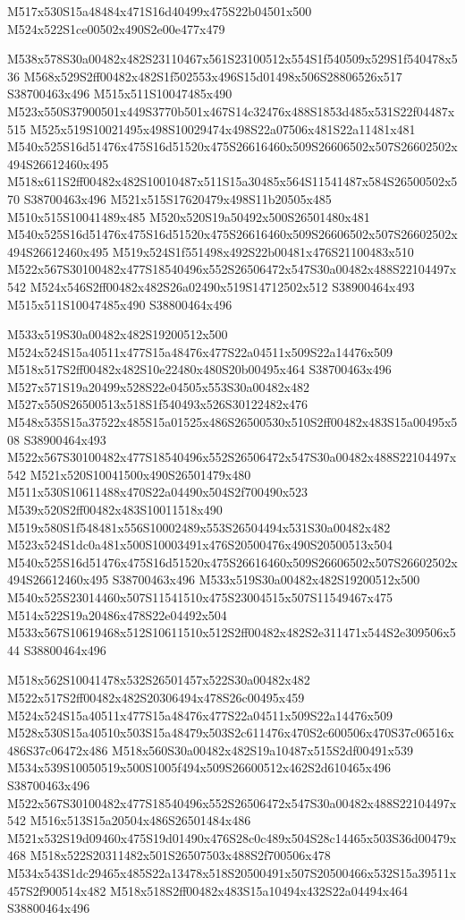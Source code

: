 \documentclass{article}
\begin{document}
\begin{multicols}{2}
\begin{center}
M517x530S15a48484x471S16d40499x475S22b04501x500 M524x522S1ce00502x490S2e00e477x479 
\end{center}


M538x578S30a00482x482S23110467x561S23100512x554S1f540509x529S1f540478x536 M568x529S2ff00482x482S1f502553x496S15d01498x506S28806526x517 S38700463x496 M515x511S10047485x490 M523x550S37900501x449S3770b501x467S14c32476x488S1853d485x531S22f04487x515 M525x519S10021495x498S10029474x498S22a07506x481S22a11481x481 M540x525S16d51476x475S16d51520x475S26616460x509S26606502x507S26602502x494S26612460x495 M518x611S2ff00482x482S10010487x511S15a30485x564S11541487x584S26500502x570 S38700463x496 M521x515S17620479x498S11b20505x485 M510x515S10041489x485 M520x520S19a50492x500S26501480x481 M540x525S16d51476x475S16d51520x475S26616460x509S26606502x507S26602502x494S26612460x495 M519x524S1f551498x492S22b00481x476S21100483x510 M522x567S30100482x477S18540496x552S26506472x547S30a00482x488S22104497x542 M524x546S2ff00482x482S26a02490x519S14712502x512 S38900464x493 M515x511S10047485x490 S38800464x496

M533x519S30a00482x482S19200512x500 M524x524S15a40511x477S15a48476x477S22a04511x509S22a14476x509 M518x517S2ff00482x482S10e22480x480S20b00495x464 S38700463x496 M527x571S19a20499x528S22e04505x553S30a00482x482 M527x550S26500513x518S1f540493x526S30122482x476 M548x535S15a37522x485S15a01525x486S26500530x510S2ff00482x483S15a00495x508 S38900464x493 M522x567S30100482x477S18540496x552S26506472x547S30a00482x488S22104497x542 M521x520S10041500x490S26501479x480 M511x530S10611488x470S22a04490x504S2f700490x523 M539x520S2ff00482x483S10011518x490 M519x580S1f548481x556S10002489x553S26504494x531S30a00482x482 M523x524S1dc0a481x500S10003491x476S20500476x490S20500513x504 M540x525S16d51476x475S16d51520x475S26616460x509S26606502x507S26602502x494S26612460x495 S38700463x496 M533x519S30a00482x482S19200512x500 M540x525S23014460x507S11541510x475S23004515x507S11549467x475 M514x522S19a20486x478S22e04492x504 M533x567S10619468x512S10611510x512S2ff00482x482S2e311471x544S2e309506x544 S38800464x496

M518x562S10041478x532S26501457x522S30a00482x482 M522x517S2ff00482x482S20306494x478S26c00495x459 M524x524S15a40511x477S15a48476x477S22a04511x509S22a14476x509 M528x530S15a40510x503S15a48479x503S2c611476x470S2c600506x470S37c06516x486S37c06472x486 M518x560S30a00482x482S19a10487x515S2df00491x539 M534x539S10050519x500S1005f494x509S26600512x462S2d610465x496 S38700463x496 M522x567S30100482x477S18540496x552S26506472x547S30a00482x488S22104497x542 M516x513S15a20504x486S26501484x486 M521x532S19d09460x475S19d01490x476S28c0c489x504S28c14465x503S36d00479x468 M518x522S20311482x501S26507503x488S2f700506x478 M534x543S1dc29465x485S22a13478x518S20500491x507S20500466x532S15a39511x457S2f900514x482 M518x518S2ff00482x483S15a10494x432S22a04494x464 S38800464x496


\end{multicols}
\end{document}
